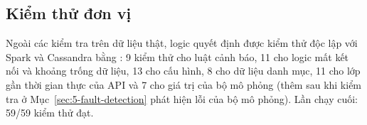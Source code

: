 \subsection{Kiểm thử đơn vị}
\label{sec:5-unit-tests}

Ngoài các kiểm tra trên dữ liệu thật, logic quyết định được kiểm thử độc lập với Spark và Cassandra bằng : 9 kiểm thử cho luật cảnh báo, 11 cho logic mất kết nối và khoảng trống dữ liệu, 13 cho cấu hình, 8 cho dữ liệu danh mục, 11 cho lớp gần thời gian thực của API và 7 cho giá trị của bộ mô phỏng (thêm sau khi kiểm tra ở Mục~\ref{sec:5-fault-detection} phát hiện lỗi của bộ mô phỏng). Lần chạy cuối: 59/59 kiểm thử đạt.
